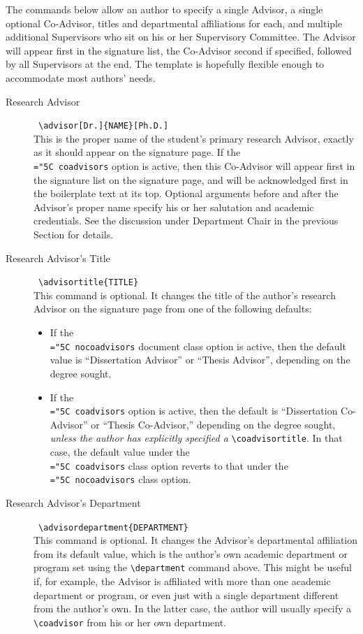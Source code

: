 \documentclass[11pt]{article}
\newcommand\code[1]{{\normalfont\texttt{\let\dv\textsl\chardef\\="5C #1}}}
\begin{document}
The commands below allow an author to specify a single Advisor, a single optional Co-Advisor, titles and departmental affiliations for each, and multiple additional Supervisors who sit on his or her Supervisory Committee.  The Advisor will appear first in the signature list, the Co-Advisor second if specified, followed by all Supervisors at the end.  The template is hopefully flexible enough to accommodate most authors' needs.
%
\begin{description}

\item[Research Advisor] \dotfill\ \verb=\advisor[Dr.]{NAME}[Ph.D.]=\\
This is the proper name of the student's primary research Advisor, exactly as it should appear on the signature page.  If the \code{coadvisors} option is active, then this Co-Advisor will appear first in the signature list on the signature page, and will be acknowledged first in the boilerplate text at its top.  Optional arguments before and after the Advisor's proper name specify his or her salutation and academic credentials.  See the discussion under Department Chair in the previous Section for details.

\item[\llap{*}Research Advisor's Title] \dotfill\ \verb=\advisortitle{TITLE}=\\
This command is optional.  It changes the title of the author's research Advisor on the signature page from one of the following defaults:
%
\begin{itemize}
\item If the \code{nocoadvisors} document class option is active, then the default value is ``Dissertation Advisor'' or ``Thesis Advisor'', depending on the degree sought.
%
\item If the \code{coadvisors} option is active, then the default is ``Dissertation Co-Advisor'' or ``Thesis Co-Advisor,'' depending on the degree sought, \textit{unless the author has explicitly specified a} \verb=\coadvisortitle=.  In that case, the default value under the \code{coadvisors} class option reverts to that under the \code{nocoadvisors} class option.
\end{itemize}

\item[\llap{*}Research Advisor's Department] \dotfill\ \verb=\advisordepartment{DEPARTMENT}=\\
This command is optional.  It changes the Advisor's departmental affiliation from its default value, which is the author's own academic department or program set using the \verb=\department= command above.  This might be useful if, for example, the Advisor is affiliated with more than one academic department or program, or even just with a single department different from the author's own.  In the latter case, the author will usually specify a \verb=\coadvisor= from his or her own department.


\end{description}
\end{document}
